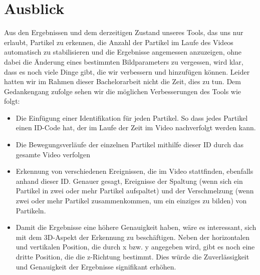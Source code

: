 \chapter{Ausblick}

Aus den Ergebnissen und dem derzeitigen Zustand unseres Tools, das uns nur erlaubt, Partikel zu erkennen, die Anzahl der Partikel im Laufe des Videos automatisch zu stabilisieren und die Ergebnisse angemessen anzuzeigen, ohne dabei die Änderung eines bestimmten Bildparameters zu vergessen, wird klar, dass es noch viele Dinge gibt, die wir verbessern und hinzufügen können. Leider hatten wir im Rahmen dieser Bachelorarbeit nicht die Zeit, dies zu tun. 
Dem Gedankengang zufolge sehen wir die möglichen Verbesserungen des Tools wie folgt: 
\begin{itemize}
 \item Die Einfügung einer Identifikation für jeden Partikel. So dass jedes Partikel einen ID-Code hat, der im Laufe der Zeit im Video nachverfolgt werden kann. 
 \item Die Bewegungsverläufe der einzelnen Partikel mithilfe dieser ID durch das gesamte Video verfolgen
 \item Erkennung von verschiedenen Ereignissen, die im Video stattfinden, ebenfalls anhand dieser ID. Genauer gesagt, Ereignisse der Spaltung (wenn sich ein Partikel in zwei oder mehr Partikel aufspaltet) und der Verschmelzung (wenn zwei oder mehr Partikel zusammenkommen, um ein einziges zu bilden) von Partikeln.
 \item Damit die Ergebnisse eine höhere Genauigkeit haben, wäre es interessant, sich mit dem 3D-Aspekt der Erkennung zu beschäftigen. Neben der horizontalen und vertikalen Position, die durch x bzw. y angegeben wird, gibt es noch eine dritte Position, die die z-Richtung bestimmt.
Dies würde die Zuverlässigkeit und Genauigkeit der Ergebnisse signifikant erhöhen.
\end{itemize}